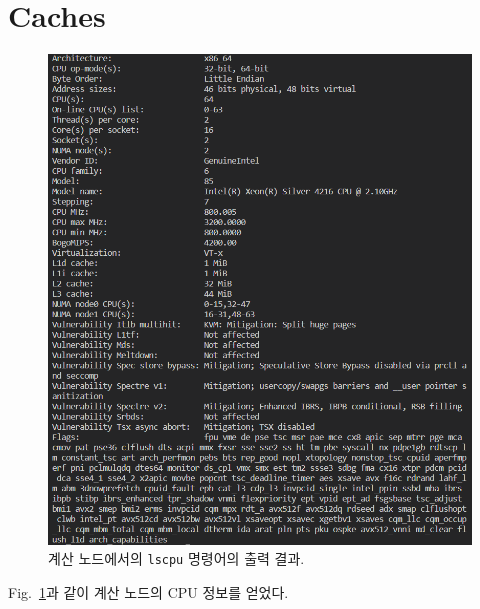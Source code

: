 \section{Caches}

\begin{figure}
    \centering
    \includegraphics[scale=0.8]{imgs/lscpu.png}
    \caption{\label{fig:lscpu}
        계산 노드에서의 \texttt{lscpu} 명령어의 출력 결과.
    }
\end{figure}

Fig.~{\ref{fig:lscpu}}과 같이 계산 노드의 CPU 정보를 얻었다.

